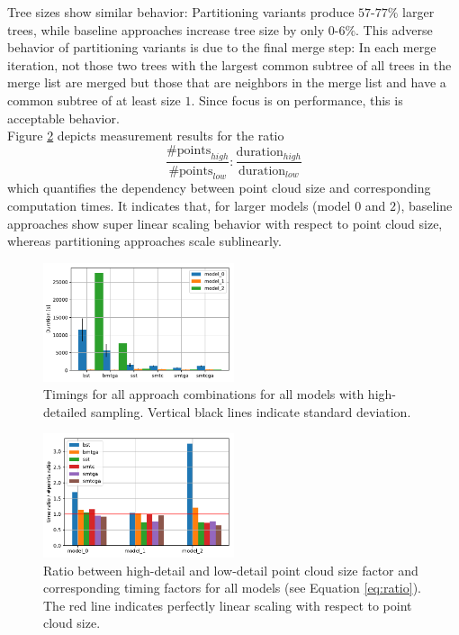 Tree sizes show similar behavior:
Partitioning variants produce $57$-$77\%$ larger trees, while baseline approaches increase tree size by only $0$-$6\%$.
This adverse behavior of partitioning variants is due to the final merge step:
In each merge iteration, not those two trees with the largest common subtree of all trees in the merge list are merged but those that are neighbors in the merge list and have a common subtree of at least size $1$.
Since focus is on performance, this is acceptable behavior.
\\
Figure \ref{fig:graph3} depicts measurement results for the ratio
\begin{equation} \label{eq:ratio}
\frac{\#\text{points}_{high}}{\#\text{points}_{low}} : \frac{\text{duration}_{high}}{\text{duration}_{low}}
\end{equation}
which quantifies the dependency between point cloud size and corresponding computation times.
It indicates that, for larger models (model $0$ and $2$), baseline approaches show super linear scaling behavior with respect to point cloud size, whereas partitioning approaches scale sublinearly. 
\begin{figure}[htb]
	\centering
	\includegraphics[width=0.5\textwidth]{figures/g1.pdf}
	\caption{Timings for all approach combinations for all models with high-detailed sampling. Vertical black lines indicate standard deviation.}
	\label{fig:graph1}
\end{figure}
\begin{figure}[htb]
	\centering
	\includegraphics[width=0.5\textwidth]{figures/g3.pdf}
	\caption{Ratio between high-detail and low-detail point cloud size factor and corresponding timing factors for all models (see Equation \ref{eq:ratio}). The red line indicates perfectly linear scaling with respect to point cloud size.}
	\label{fig:graph3}
\end{figure}

